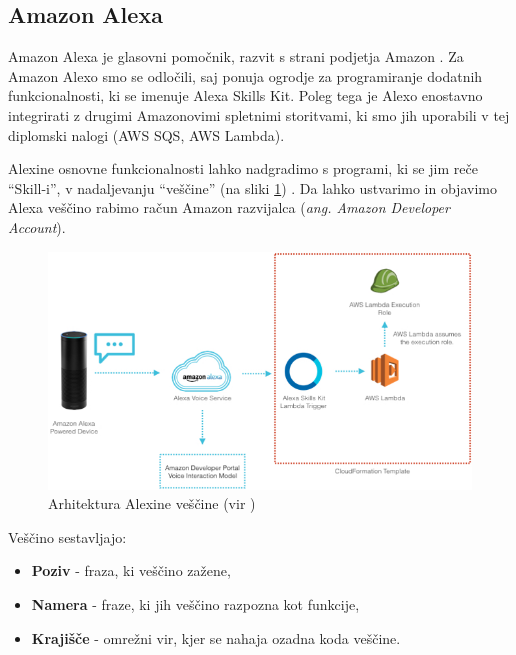 \documentclass[a4paper, 12pt]{book}
\begin{document}
\subsection{Amazon Alexa}

Amazon Alexa je glasovni pomočnik, razvit s strani podjetja Amazon \cite{alexa}.
Za Amazon Alexo smo se odločili, saj ponuja ogrodje za programiranje dodatnih funkcionalnosti, ki se imenuje Alexa Skills Kit.
Poleg tega je Alexo enostavno integrirati z drugimi Amazonovimi spletnimi storitvami, ki smo jih uporabili v tej diplomski nalogi (AWS SQS, AWS Lambda).

Alexine osnovne funkcionalnosti lahko nadgradimo s programi, ki se jim reče \enquote{Skill-i}, v nadaljevanju \enquote{veščine} (na sliki \ref{alexa_architecture}) \cite{alexaskills}.
Da lahko ustvarimo in objavimo Alexa veščino rabimo račun Amazon razvijalca (\textit{ang. Amazon Developer Account}).

\clearpage

\begin{figure}[H]
\begin{center}
\includegraphics[width=13.5cm]{alexa_architecture}
\end{center}
	\caption{Arhitektura Alexine veščine (vir \cite{alexaarchitecture})}
\label{alexa_architecture}
\end{figure}

\noindent Veščino sestavljajo:
\begin{itemize}
	\item \textbf{Poziv} - fraza, ki veščino zažene,
	\item \textbf{Namera} - fraze, ki jih veščino razpozna kot funkcije,
	\item \textbf{Krajišče} - omrežni vir, kjer se nahaja ozadna koda veščine.
\end{itemize}
\end{document}
